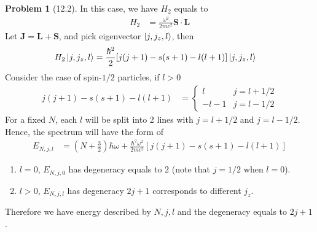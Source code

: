 \documentclass[twoside,11pt]{article}
\theoremstyle{definition}
\newtheorem{problem}{Problem}
\theoremstyle{remark}
\begin{document}
\begin{problem}[12.2]
In this case, we have $H_2$ equals to
\begin{align*}
    H_2 &= \frac{\omega^2}{2mc^2}\mathbf{S}\cdot\mathbf{L}
\end{align*}
Let $\mathbf{J}=\mathbf{L}+\mathbf{S}$, and pick eigenvector $\ket{j,j_z,l}$, then
\begin{align*}
    H_2\ket{j,j_z,l} &= 
    \frac{\hbar^2}{2}[j(j+1)-s(s+1)-l(l+1)]\ket{j,j_z,l}
\end{align*}
Consider the case of spin-$1/2$ particles, if $l>0$
\begin{align*}
    j(j+1)-s(s+1)-l(l+1) &= \begin{cases}
        l & j = l + 1/2\\
        -l-1 & j = l - 1/2
    \end{cases}
\end{align*}
For a fixed $N$, each $l$ will be split into 2 lines
with $j=l+1/2$ and $j=l-1/2$.
Hence, the spectrum will have the form of
\begin{align*}
    E_{N,j,l} &= 
    \left(N+\frac{3}{2}\right)\hbar\omega 
    + \frac{\hbar^2\omega^2}{2mc^2}[j(j+1)-s(s+1)-l(l+1)]
\end{align*}
\begin{enumerate}[label=(\alph*)]
    \item $l=0$, $E_{N,j,0}$ has degeneracy equals to $2$ (note that $j=1/2$ when $l=0$).
    \item $l>0$, $E_{N,j,l}$ has degeneracy $2j+1$ corresponds to different $j_z$.
\end{enumerate}
Therefore we have energy described by $N,j,l$ and the degeneracy equals to $2j+1$.


\end{problem}
\end{document}
